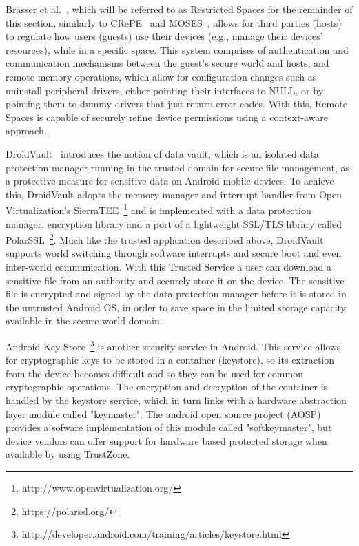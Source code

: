 Brasser et al.~\cite{brasserregulating}, which will be referred to as Restricted Spaces for the remainder of this section, similarly to CRePE~\cite{conti2011crepe} and MOSES~\cite{russello2012moses}, allows for third parties (hosts) to regulate how users (guests) use their devices (e.g., manage their devices’ resources), while in a specific space. This system comprises of authentication and communication mechanisms between the guest's secure world and hosts, and remote memory operations, which allow for configuration changes such as uninstall peripheral drivers, either pointing their interfaces to NULL, or by pointing them to dummy drivers that just return error codes. With this, Remote Spaces is capable of securely refine device permissions using a context-aware approach.

DroidVault~\cite{li2014droidvault} introduces the notion of data vault, which is an isolated data protection manager running in the trusted domain for secure file management, as a protective measure for sensitive data on Android mobile devices. To achieve this, DroidVault adopts the memory manager and interrupt handler from Open Virtualization's SierraTEE~\footnote{http://www.openvirtualization.org/} and is implemented with a data protection manager, encryption library and a port of a lightweight SSL/TLS library called PolarSSL~\footnote{https://polarssl.org/}. Much like the trusted application described above, DroidVault supports world switching through software interrupts and secure boot and even inter-world communication. With this Trusted Service a user can download a sensitive file from an authority and securely store it on the device. The sensitive file is encrypted and signed by the data protection manager before it is stored in the untrusted Android OS, in order to save space in the limited storage capacity available in the secure world domain.

Android Key Store~\footnote{http://developer.android.com/training/articles/keystore.html} is another security service in Android. This service allows for cryptographic keys to be stored in a container (keystore), so its extraction from the device becomes difficult and so they can be used for common cryptographic operations. The encryption and decryption of the container is handled by the keystore service, which in turn links with a hardware abstraction layer module called "keymaster". The android open source project (AOSP) provides a sofware implementation of this module called "softkeymaster", but device vendors can offer support for hardware based protected storage when available by using TrustZone.


